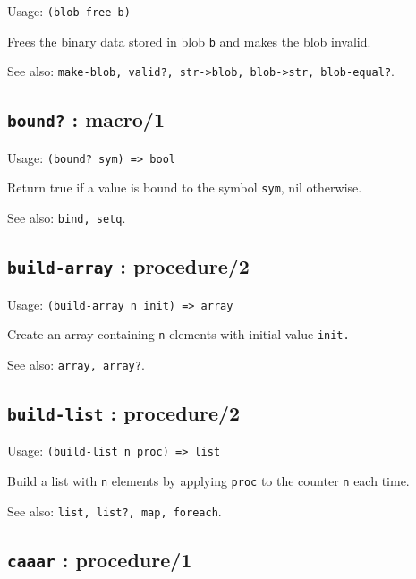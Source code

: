 \documentclass[
]{article}
\newcommand{\passthrough}[1]{#1}
\begin{document}
Usage: \passthrough{\lstinline!(blob-free b)!}

Frees the binary data stored in blob \passthrough{\lstinline!b!} and
makes the blob invalid.

See also:
\passthrough{\lstinline!make-blob, valid?, str->blob, blob->str, blob-equal?!}.

\hypertarget{bound-macro1-1}{%
\subsection{\texorpdfstring{\texttt{bound?} :
macro/1}{bound? : macro/1}}\label{bound-macro1-1}}

Usage: \passthrough{\lstinline!(bound? sym) => bool!}

Return true if a value is bound to the symbol
\passthrough{\lstinline!sym!}, nil otherwise.

See also: \passthrough{\lstinline!bind, setq!}.

\hypertarget{build-array-procedure2-1}{%
\subsection{\texorpdfstring{\texttt{build-array} :
procedure/2}{build-array : procedure/2}}\label{build-array-procedure2-1}}

Usage: \passthrough{\lstinline!(build-array n init) => array!}

Create an array containing \passthrough{\lstinline!n!} elements with
initial value \passthrough{\lstinline!init.!}

See also: \passthrough{\lstinline!array, array?!}.

\hypertarget{build-list-procedure2-1}{%
\subsection{\texorpdfstring{\texttt{build-list} :
procedure/2}{build-list : procedure/2}}\label{build-list-procedure2-1}}

Usage: \passthrough{\lstinline!(build-list n proc) => list!}

Build a list with \passthrough{\lstinline!n!} elements by applying
\passthrough{\lstinline!proc!} to the counter
\passthrough{\lstinline!n!} each time.

See also: \passthrough{\lstinline!list, list?, map, foreach!}.

\hypertarget{caaar-procedure1-1}{%
\subsection{\texorpdfstring{\texttt{caaar} :
procedure/1}{caaar : procedure/1}}\label{caaar-procedure1-1}}
\end{document}
